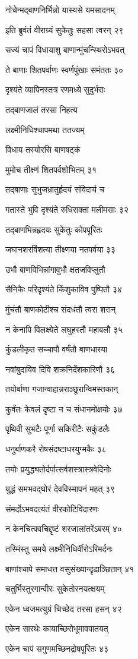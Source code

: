 नोचेन्मद्बाणनिर्भिन्नो यास्यसे यमसादनम्

इति ब्रुवंतं वीराग्र्यं सुकेतुः सहसा त्वरन् २९

सज्यं चापं विधायाशु बाणान्मुंचन्स्थिरोऽभवत्

ते बाणाः शितपर्वाणः स्वर्णपुंखाः समंततः ३०

दृश्यंते व्यापिनस्तत्र रणमध्ये सुदुर्भराः

तद्बाणजालं तरसा निहत्य

लक्ष्मीनिधिश्चापमथा ततज्यम्

विधाय तस्योरसि बाणषट्कं

मुमोच तीक्ष्णं शितपर्वशोभितम् ३१

तद्बाणाः सुभुजभ्रातुर्हृदयं संविदार्य च

गतास्ते भुवि दृश्यंते रुधिराक्ता मलीमसाः ३२

तद्बाणभिन्नहृदयः सुकेतुः कोपपूरितः

जघानशरविंशत्या तीक्ष्णया नतपर्वया ३३

उभौ बाणविभिन्नांगावुभौ क्षतजविप्लुतौ

सैनिकैः परिदृश्यंते किंशुकाविव पुष्पितौ ३४

मुंचंतौ बाणकोटीश्च संदधंतौ त्वरा शरान्

न केनापि विलक्ष्येते लघुहस्तौ महाबलौ ३५

कुंडलीकृत सच्चापौ वर्षंतौ बाणधारया

नवांबुदाविव दिवि शक्रनिर्देशकारिणौ ३६

तयोर्बाणा गजान्वाहान्नराञ्छूरान्विमस्तकान्

कुर्वंतः केवलं दृष्टा न च संधानमोक्षयोः ३७

पृथिवी सुभटैः पूर्णा सकिरीटैः सकुंडलैः

धनुर्बाणकरै रोषसंदष्टाधरयुग्मकैः ३८

तयोः प्रयुद्ध्यतोर्दर्पात्सर्वशस्त्रास्त्रवेदिनोः

युद्धं समभवद्घोरं देवविस्मापनं महत् ३९

संमर्दोऽभवदत्यंतं वीरकोटिविदारणः

न केनचित्क्वचिद्दृष्टं शरजालांतरेंऽबरम् ४०

तस्मिंस्तु समये लक्ष्मीनिधिर्वीरोऽरिमर्दनः

बाणांश्चापे समाधत्त वसुसंख्यान्दृढाञ्छितान् ४१

चतुर्भिस्तुरगान्वीरः सुकेतोरनयत्क्षयम्

एकेन ध्वजमत्युग्रं चिच्छेद तरसा हसन् ४२

एकेन सारथेः कायाच्छिरोभूमावपातयत्

एकेन चापं सगुणमच्छिनद्रोषपूरितः ४३

